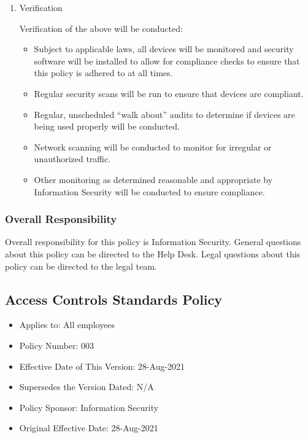\documentclass[stu]{apa7}
\begin{document}
\begin{enumerate}
\item Verification
\label{sec:org8c3a008}

Verification of the above will be conducted:

\begin{itemize}
\item Subject to applicable laws, all devices will be monitored and security software will be installed to allow for compliance checks to ensure that this policy is adhered to at all times.
\item Regular security scans will be run to ensure that devices are compliant.
\item Regular, unscheduled ``walk about'' audits to determine if devices are being used properly will be conducted.
\item Network scanning will be conducted to monitor for irregular or unauthorized traffic.
\item Other monitoring as determined reasonable and appropriate by Information Security will be conducted to ensure compliance.
\end{itemize}
\end{enumerate}

\subsubsection{Overall Responsibility}
\label{sec:org0dcc74c}

Overall responsibility for this policy is Information Security. General questions about this policy can be directed to the Help Desk. Legal questions about this policy can be directed to the legal team.

\subsection{Access Controls Standards Policy}
\label{sec:orgd01a907}

\begin{itemize}
\item Applies to: All employees
\item Policy Number: 003
\item Effective Date of This Version: 28-Aug-2021
\item Supersedes the Version Dated: N/A
\item Policy Sponsor: Information Security
\item Original Effective Date: 28-Aug-2021
\end{itemize}
\end{document}
